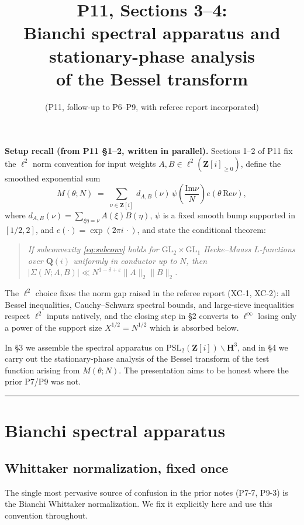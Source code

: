\documentclass[11pt]{article}
\title{P11, Sections 3--4:\\
Bianchi spectral apparatus and stationary-phase analysis\\
of the Bessel transform}
\author{(P11, follow-up to P6--P9, with referee report incorporated)}
\date{}
\theoremstyle{definition}
\newcommand{\Z}{\mathbf{Z}}
\newcommand{\Q}{\mathbf{Q}}
\newcommand{\HH}{\mathbf{H}}
\newcommand{\Zi}{\Z[i]}
\renewcommand{\Re}{\mathrm{Re}}
\renewcommand{\Im}{\mathrm{Im}}
\begin{document}
\maketitle

\noindent\textbf{Setup recall (from P11 \S1--2, written in parallel).} Sections 1--2 of P11 fix the $\ell^2$ norm convention for input weights $A,B \in \ell^2(\Zi_{\ge 0})$, define the smoothed exponential sum
\[
   M(\theta;N) \;=\; \sum_{\nu \in \Zi}\, d_{A,B}(\nu)\, \psi\!\left(\frac{\Im \nu}{N}\right) e(\theta\, \Re \nu),
\]
where $d_{A,B}(\nu) = \sum_{\xi\eta=\nu} A(\xi)B(\eta)$, $\psi$ is a fixed smooth bump supported in $[1/2,2]$, and $e(\cdot)=\exp(2\pi i\,\cdot)$, and state the conditional theorem:
\begin{quote}
\emph{If subconvexity \eqref{eq:subconv} holds for $\mathrm{GL}_2 \times \mathrm{GL}_1$ Hecke--Maass $L$-functions over $\Q(i)$ uniformly in conductor up to $N$, then $|\Sigma(N;A,B)| \ll N^{1-\delta+\varepsilon}\|A\|_2\|B\|_2$.}
\end{quote}
The $\ell^2$ choice fixes the norm gap raised in the referee report (XC-1, XC-2): all Bessel inequalities, Cauchy--Schwarz spectral bounds, and large-sieve inequalities respect $\ell^2$ inputs natively, and the closing step in \S2 converts to $\ell^\infty$ losing only a power of the support size $X^{1/2} = N^{1/2}$ which is absorbed below.

In \S3 we assemble the spectral apparatus on $\mathrm{PSL}_2(\Zi) \backslash \HH^3$, and in \S4 we carry out the stationary-phase analysis of the Bessel transform of the test function arising from $M(\theta;N)$. The presentation aims to be honest where the prior P7/P9 was not.

\bigskip\hrule\bigskip

\section{Bianchi spectral apparatus}\label{sec:bianchi}

\subsection{Whittaker normalization, fixed once}\label{ssec:whittaker-norm}

The single most pervasive source of confusion in the prior notes (P7-7, P9-3) is the Bianchi Whittaker normalization. We fix it explicitly here and use this convention throughout.
\end{document}

